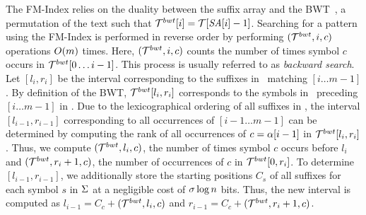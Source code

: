 The FM-Index relies on the duality between the suffix array and the BWT~\cite{bw-dec94}, 
a permutation of the text such that $\mathcal{T}^{bwt}[i] = \mathcal{T}[\mbox{\emph{SA}}[i]-1]$. Searching for
a pattern using the FM-Index is performed in reverse order by performing  
{\rankop$(\mathcal{T}^{bwt},i,c)$} operations $O(m)$ times. Here, {\rankop$(\mathcal{T}^{bwt},i,c)$}  
counts the number of times symbol $c$ occurs in $\mathcal{T}^{bwt}[0\ldots i-1]$. 
This process is usually referred to as {\it backward search}. Let \SA$[l_i,r_i]$ be
the interval corresponding to the suffixes in \col\ matching \pattern$[i\ldots m-1]$.
By definition of the BWT, $\mathcal{T}^{bwt}[l_i,r_i]$ corresponds to the symbols in \col\
preceding \pattern$[i\ldots m-1]$ in \col. Due to the lexicographical ordering
of all suffixes in \SA, the interval \SA$[l_{i-1},r_{i-1}]$ corresponding to all
occurrences of \pattern$[i-1\ldots m-1]$ can be determined by computing the rank
of all occurrences of $c=\alpha[i-1]$ in $\mathcal{T}^{bwt}[l_i,r_i]$. Thus, we compute
\rankop$(\mathcal{T}^{bwt},l_i,c)$, the number of times symbol $c$ occurs before
$l_i$ and \rankop$(\mathcal{T}^{bwt},r_i+1,c)$, the number of occurrences of $c$ in $\mathcal{T}^{bwt}[0,r_i]$.
To determine \SA$[l_{i-1},r_{i-1}]$, we additionally store the starting positions $C_{s}$
of all suffixes for each symbol $s$ in $\Sigma$ at a negligible cost 
of $\sigma \log n$ bits.
Thus, the new interval is computed as $l_{i-1} = C_c + $\rankop$(\mathcal{T}^{bwt},l_i,c)$ 
and $r_{i-1} = C_c + $\rankop$(\mathcal{T}^{bwt},r_i+1,c)$.


